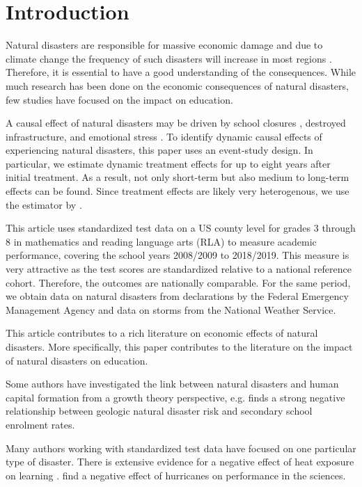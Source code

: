 
\section{Introduction}

Natural disasters are responsible for massive economic damage and due to climate change the frequency of such disasters will increase in most regions \citep{IPCC_2021}. Therefore, it is essential to have a good understanding of the consequences. While much research has been done on the economic consequences of natural disasters, few studies have focused on the impact on education.

A causal effect of natural disasters may be driven by school closures \citep{Grewening_2020}, destroyed infrastructure, and emotional stress \citep{Vogel_2016}. To identify dynamic causal effects of experiencing natural disasters, this paper uses an event-study design. In particular, we estimate dynamic treatment effects for up to eight years after initial treatment. As a result, not only short-term but also medium to long-term effects can be found. Since treatment effects are likely very heterogenous, we use the estimator by \cite{Sun_2021}. 

This article uses standardized test data on a US county level for grades 3 through 8 in mathematics and reading language arts (RLA) to measure academic performance, covering the school years 2008/2009 to 2018/2019. This measure is very attractive as the test scores are standardized relative to a national reference cohort. Therefore, the outcomes are nationally comparable. For the same period, we obtain data on natural disasters from declarations by the Federal Emergency Management Agency and data on storms from the National Weather Service.



This article contributes to a rich literature on economic effects of natural disasters. More specifically, this paper contributes to the literature on the impact of natural disasters on education.

Some authors have investigated the link between natural disasters and human capital formation from a growth theory perspective, e.g. \cite{Cuaresma_2010} finds a strong negative relationship between geologic natural disaster risk and secondary school enrolment rates. 

Many authors working with standardized test data have focused on one particular type of disaster. There is extensive evidence for a negative effect of heat exposure on learning \cite[e.g.][]{Goodman_2020, Park_2020}. \cite{Spencer_2016} find a negative effect of hurricanes on performance in the sciences.

